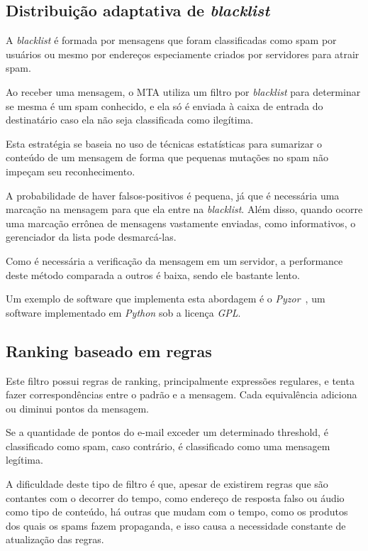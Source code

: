 \documentclass[a4paper,dvipdfm]{article}
\begin{document}
	\subsection{Distribuição adaptativa de \emph{blacklist}}
		A \emph{blacklist} é formada por mensagens que foram classificadas como spam por usuários ou mesmo por endereços especiamente criados por servidores para atrair spam.

		Ao receber uma mensagem, o MTA utiliza um filtro por \emph{blacklist} para determinar se mesma é um spam conhecido, e ela só é enviada à caixa de entrada do destinatário caso ela não seja classificada como ilegítima.

		Esta estratégia se baseia no uso de técnicas estatísticas para sumarizar o conteúdo de um mensagem de forma que pequenas mutações no spam não impeçam seu reconhecimento.

		A probabilidade de haver falsos-positivos é pequena, já que é necessária uma marcação na mensagem para que ela entre na \emph{blacklist}. Além disso, quando ocorre uma marcação errônea de mensagens vastamente enviadas, como informativos, o gerenciador da lista pode desmarcá-las.
		
		Como é necessária a verificação da mensagem em um servidor, a performance deste método comparada a outros é baixa, sendo ele bastante lento.

		Um exemplo de software que implementa esta abordagem é o \emph{Pyzor}~\cite{pyzor}, um software implementado em \emph{Python} sob a licença \emph{GPL}.

	\subsection{Ranking baseado em regras}
		Este filtro possui regras de ranking, principalmente expressões regulares, e tenta fazer correspondências entre o padrão e a mensagem. 
		Cada equivalência adiciona ou diminui pontos da mensagem.
		
		Se a quantidade de pontos do e-mail exceder um determinado threshold, é classificado como spam, caso contrário, é classificado como uma mensagem legítima.

		A dificuldade deste tipo de filtro é que, apesar de existirem regras que são contantes com o decorrer do tempo, como endereço de resposta falso ou áudio como tipo de conteúdo, há outras que mudam com o tempo, como os produtos dos quais os spams fazem propaganda, e isso causa a necessidade constante de atualização das regras.
\end{document}
